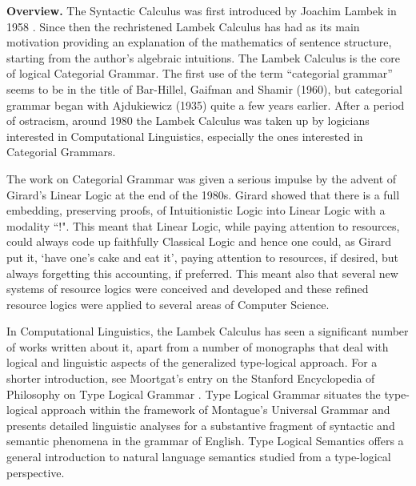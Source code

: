 \documentclass{entcs}
\begin{document}
\textbf{Overview.} The Syntactic Calculus was first introduced by
Joachim Lambek in 1958 \cite{Lambek1958}. Since then the rechristened
Lambek Calculus has had as its main motivation providing an
explanation of the mathematics of sentence structure, starting from
the author's algebraic intuitions. The Lambek Calculus is the core of
logical Categorial Grammar.  The first use of the term “categorial
grammar” seems to be in the title of Bar-Hillel, Gaifman and Shamir
(1960), but categorial grammar began with Ajdukiewicz (1935) quite a
few years earlier. After a period of ostracism, around 1980 the Lambek
Calculus was taken up by logicians interested in Computational
Linguistics, especially the ones interested in Categorial
Grammars. %

The work on Categorial Grammar was given a serious impulse by the
advent of Girard's Linear Logic  at the end of the 1980s.  Girard \cite{Girard:1987}
showed that there is a full embedding, preserving proofs, of
Intuitionistic Logic into Linear Logic with a modality ``!". This
meant that Linear Logic, while paying attention to resources, could
always code up faithfully Classical Logic and hence one could, as
Girard put it, `have one's cake and eat it', paying attention to
resources, if desired, but always forgetting this accounting, if
preferred. This meant also that several new
systems of resource logics were conceived and developed and these
refined resource logics were applied to several areas of Computer
Science.

In Computational Linguistics, the Lambek Calculus 
has seen a significant number of works written
about it,  apart from a number of monographs that deal with
logical and linguistic aspects of the generalized type-logical
approach.  
For a shorter introduction, see Moortgat's entry on the Stanford Encyclopedia of Philosophy  on Type Logical Grammar \cite{MoortgatSEP}.
Type Logical Grammar situates the type-logical approach within the
framework of Montague's Universal Grammar and presents detailed
linguistic analyses for a substantive fragment of syntactic and
semantic phenomena in the grammar of English.  Type Logical Semantics offers a general introduction to natural language semantics studied from a type-logical perspective.
\end{document}
